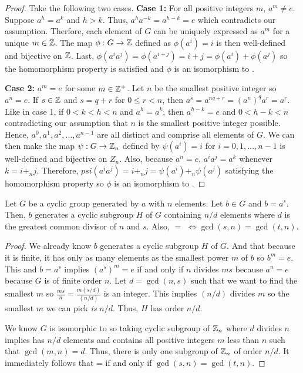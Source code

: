 \begin{proof}
    Take the following two cases.
    \textbf{Case 1:} For all positive integers $m$, $a^m \neq e$. Suppose $a^h = a^k$ and $h>k$. Thus, $a^ha^{-k} = a^{h-k} = e$ which contradicts our assumption. Therfore, each element of $G$ can be uniquely expressed as $a^m$ for a unique $m \in \mathbb{Z}$. The map $\phi: G \to \mathbb{Z}$ defined as $\phi(a^i) = i$ is then well-defined and bijective on $\mathbb{Z}$. Last, $\phi(a^ia^j) = \phi(a^{i+j}) = i+j = \phi(a^i)+\phi(a^j)$ so the homomorphism property is satisfied and $\phi$ is an isomorphism to \group{\Z}{+}.
    
    \textbf{Case 2:} $a^m = e$ for some $m \in \mathbb{Z}^+$.  Let $n$ be the smallest positive integer so $a^n =e$. If $s \in \mathbb{Z}$ and $s=q+r$ for $0\leq r<n$, then $a^s = a^{nq+r} = (a^n)^qa^r = a^r.$ Like in case 1, if $0<k<h<n$ and $a^h = a^k$, then $a^{h-k} =e$ and $0<h-k<n$ contradicting our assumption that $n$ is the smallest positive integer possible. Hence, $a^0, a^1, a^2, \ldots, a^{n-1}$ are all distinct and comprise all elements of $G$. We can then make the map $\psi:G\to\mathbb{Z}_n$ defined by $\psi(a^i)=i$ for $i=0,1,\ldots,n-1$ is well-defined and bijective on $Z_n$. Also, because $a^n =e$, $a^ia^j=a^k$ whenever $k=i+_nj$. Therefore, $psi(a^ia^j)=i+_nj=\psi(a^i)+_n\psi(a^j)$ satisfying the homomorphism property so $\phi$ is an isomorphism to .
\end{proof}
\begin{theorem}
    Let $G$ be a cyclic group generated by $a$ with $n$ elements. Let $b \in G$ and $b = a^s$. Then, $b$ generates a cyclic subgroup $H$ of $G$ containing $n/d$ elements where $d$ is the greatest common divisor of $n$ and $s$. Also,  $=$  $\iff \gcd(s,n) = \gcd(t,n)$. 
\end{theorem}
\begin{proof}
    We already know $b$ generates a cyclic subgroup $H$ of $G$. And that because it is finite, it has only as many elements as the smallest power $m$ of $b$ so $b^m=e$. This and $b=a^s$ implies $(a^s)^m=e$ if and only if $n$ divides $ms$ because $a^n = e$ because $G$ is of finite order $n$. Let $d = \gcd(n,s)$ such that we want to find the smallest $m$ so $\frac{ms}{n}=\frac{m(s/d)}{(n/d)}$ is an integer. This implies $(n/d)$ divides $m$ so the smallest $m$ we can pick \emph{is} $n/d$. Thus, $H$ has order $n/d$. 
    
    We know $G$ is isomorphic to  so taking cyclic subgroup  of $\mathbb{Z}_n$ where $d$ divides $n$ implies  has $n/d$ elements and contains all positive integers $m$ less than $n$ such that $\gcd(m,n)=d$. Thus, there is only one subgroup of $\mathbb{Z}_n$ of order $n/d$. It immediately follows that  =  if and only if $\gcd(s,n) = \gcd(t,n)$.
\end{proof}
